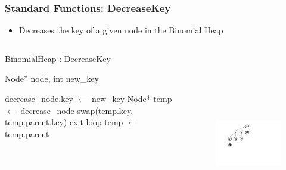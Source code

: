 \documentclass[13pt]{beamer}
\begin{document}
\begin{frame}
\frametitle{Standard Functions: DecreaseKey}
  \begin{itemize}
    \item Decreases the key of a given node in the Binomial Heap 
  \end{itemize}

  \begin{columns}[T] %
    \begin{column}[T]{6cm} %
        \begin{algorithm}[H]
        \small
        \caption{BinomialHeap : DecreaseKey}
        \begin{algorithmic}
          \REQUIRE Node* node, int new\_key

          \STATE decrease\_node.key $\leftarrow$ new\_key
          \STATE Node* temp $\leftarrow$ decrease\_node
                \STATE swap(temp.key, temp.parent.key)
              \ELSE
                \STATE exit loop
              \ENDIF
              \STATE temp $\leftarrow$ temp.parent
          \ENDWHILE
        \end{algorithmic}
        \end{algorithm}
    \end{column}
    \begin{column}[T]{7cm} %
      \begin{figure}
        \includegraphics[height=8cm]{./img/decreasekeyA.png}
      \end{figure}
    \end{column}
  \end{columns}

\end{frame}
\end{document}
